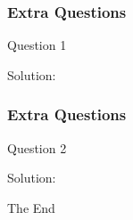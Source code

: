 \documentclass{beamer}
\begin{document}

\begin{frame}
\frametitle{Extra Questions}
\begin{block}{Question 1}

\end{block}

\begin{block}{Solution:}

\end{block}


\end{frame}



\begin{frame}
\frametitle{Extra Questions}
\begin{block}{Question 2}

\end{block}

\begin{block}{Solution:}

\end{block}


\end{frame}


\begin{frame}
\Huge{\centerline{The End}}
\end{frame}

\end{document}
